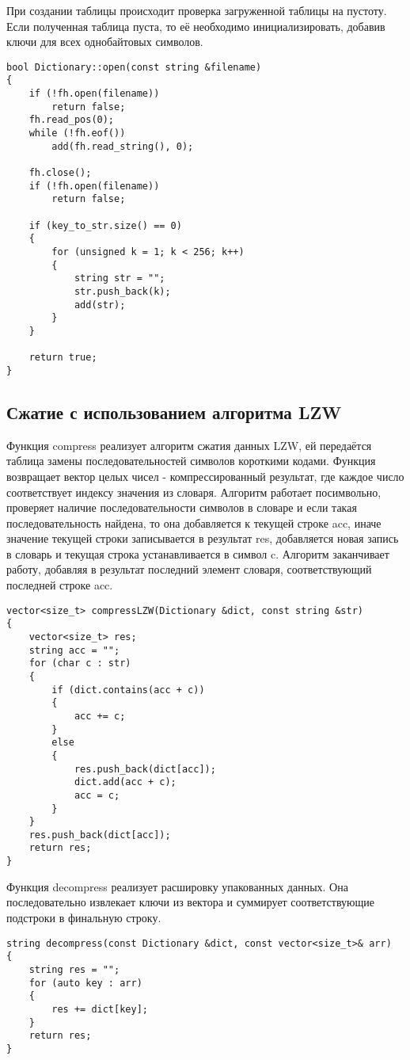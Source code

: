 \documentclass[14pt, russian]{scrartcl}
\begin{document}
При создании таблицы происходит проверка загруженной таблицы на пустоту. Если полученная таблица пуста, то её необходимо инициализировать, добавив ключи для всех однобайтовых символов. 

\begin{verbatim}
bool Dictionary::open(const string &filename)
{
	if (!fh.open(filename))
		return false;
	fh.read_pos(0);
	while (!fh.eof())
		add(fh.read_string(), 0);

	fh.close();
	if (!fh.open(filename))
		return false;

	if (key_to_str.size() == 0)
	{
		for (unsigned k = 1; k < 256; k++)
		{
			string str = "";
			str.push_back(k);
			add(str);
		}
	}

	return true;
}
\end{verbatim}


\subsection{Сжатие с использованием алгоритма LZW}
Функция compress реализует алгоритм сжатия данных LZW, ей передаётся таблица замены последовательностей символов короткими кодами. Функция возвращает вектор целых чисел - компрессированный результат, где каждое число соответствует индексу значения из словаря. Алгоритм работает посимвольно, проверяет наличие последовательности символов в словаре и если такая последовательность найдена, то она добавляется к текущей строке acc, иначе значение текущей строки записывается в результат res, добавляется новая запись в словарь и текущая строка устанавливается в символ c. Алгоритм заканчивает работу, добавляя в результат последний элемент словаря, соответствующий последней строке acc.

\begin{verbatim}
vector<size_t> compressLZW(Dictionary &dict, const string &str)
{
	vector<size_t> res;
	string acc = "";
	for (char c : str)
	{
		if (dict.contains(acc + c))
		{
			acc += c;
		}
		else
		{
			res.push_back(dict[acc]);
			dict.add(acc + c);
			acc = c;
		}
	}
	res.push_back(dict[acc]);
	return res;
}
\end{verbatim}

Функция decompress реализует расшировку упакованных данных. Она последовательно извлекает ключи из вектора и суммирует соответствующие подстроки в финальную строку.

\begin{verbatim}
string decompress(const Dictionary &dict, const vector<size_t>& arr)
{
	string res = "";
	for (auto key : arr)
	{
		res += dict[key];
	}
	return res;
}
\end{verbatim}
\end{document}

